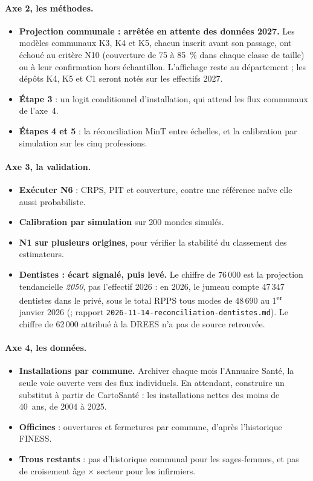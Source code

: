 \paragraph{Axe 2, les méthodes.}
\begin{itemize}
  \item \textbf{Projection communale : arrêtée en attente des données 2027.} Les modèles communaux K3, K4 et K5,
        chacun inscrit avant son passage, ont échoué au critère N10 (couverture de 75 à 85~\% dans chaque classe de
        taille) ou à leur confirmation hors échantillon. L'affichage reste au département ; les dépôts K4, K5 et C1
        seront notés sur les effectifs 2027.
  \item \textbf{Étape 3} : un logit conditionnel d'installation, qui attend les flux
        communaux de l'axe~4.
  \item \textbf{Étapes 4 et 5} : la réconciliation MinT entre échelles, et la calibration par
        simulation sur les cinq professions.
\end{itemize}

\paragraph{Axe 3, la validation.}
\begin{itemize}
  \item \textbf{Exécuter N6} : CRPS, PIT et couverture, contre une référence naïve elle aussi
        probabiliste.
  \item \textbf{Calibration par simulation} sur 200 mondes simulés.
  \item \textbf{N1 sur plusieurs origines}, pour vérifier la stabilité du classement des
        estimateurs.
  \item \textbf{Dentistes : écart signalé, puis levé.} Le chiffre de 76\,000 est la projection
        tendancielle \emph{2050}, pas l'effectif 2026 : en 2026, le jumeau compte 47\,347 dentistes
        dans le privé, sous le total RPPS tous modes de 48\,690 au 1\textsuperscript{er} janvier 2026
        (\mesure ; rapport \texttt{2026-11-14-reconciliation-dentistes.md}). Le chiffre de 62\,000
        attribué à la DREES n'a pas de source retrouvée.
\end{itemize}

\paragraph{Axe 4, les données.}
\begin{itemize}
  \item \textbf{Installations par commune.} Archiver chaque mois l'Annuaire Santé, la seule voie
        ouverte vers des flux individuels. En attendant, construire un substitut à partir de
        CartoSanté : les installations nettes des moins de 40~ans, de 2004 à 2025.
  \item \textbf{Officines} : ouvertures et fermetures par commune, d'après l'historique FINESS.
  \item \textbf{Trous restants} : pas d'historique communal pour les sages-femmes, et pas de
        croisement âge $\times$ secteur pour les infirmiers.
\end{itemize}

